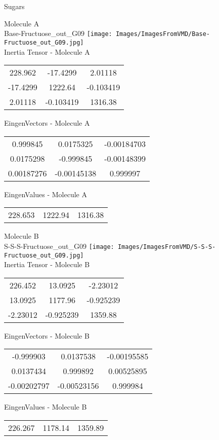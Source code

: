 \vtab[-2cm]
\begin{center}
{\large Sugars}
\end{center}
\begin{multicols}{2}
\begin{center}
Molecule A \\ 
Base-Fructuose\_out\_G09
\texttt{[image: Images/ImagesFromVMD/Base-Fructuose\_out\_G09.jpg]}
\\
Inertia Tensor - Molecule A \\
\vtab
\begin{tabular}{|c c c|}
228.962	 & 	-17.4299	 & 	2.01118	 \\
-17.4299	 & 	1222.64	 & 	-0.103419	 \\
2.01118	 & 	-0.103419	 & 	1316.38
\end{tabular}

\vtab
 EingenVectors - Molecule A     \\
\vtab
\begin{tabular}{|c c c|}
0.999845	 & 	0.0175325	 & 	-0.00184703	 \\
0.0175298	 & 	-0.999845	 & 	-0.00148399	 \\
0.00187276	 & 	-0.00145138	 & 	0.999997
\end{tabular}

\vtab
 EingenValues - Molecule A     \\
\vtab
\begin{tabular}{|c c c|}
228.653	 & 	1222.94	 & 	1316.38
\end{tabular}
\columnbreak

Molecule B \\ 
S-S-S-Fructuose\_out\_G09
\texttt{[image: Images/ImagesFromVMD/S-S-S-Fructuose\_out\_G09.jpg]}
\\
Inertia Tensor - Molecule B \\
\vtab
\begin{tabular}{|c c c|}
226.452	 & 	13.0925	 & 	-2.23012	 \\
13.0925	 & 	1177.96	 & 	-0.925239	 \\
-2.23012	 & 	-0.925239	 & 	1359.88
\end{tabular}

\vtab
 EingenVectors - Molecule B     \\
\vtab
\begin{tabular}{|c c c|}
-0.999903	 & 	0.0137538	 & 	-0.00195585	 \\
0.0137434	 & 	0.999892	 & 	0.00525895	 \\
-0.00202797	 & 	-0.00523156	 & 	0.999984
\end{tabular}

\vtab
 EingenValues - Molecule B     \\
\vtab
\begin{tabular}{|c c c|}
226.267	 & 	1178.14	 & 	1359.89
\end{tabular}

\end{center}
\end{multicols}
